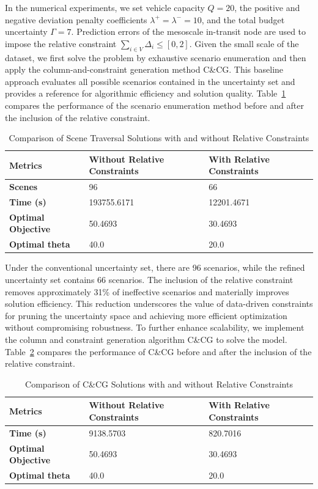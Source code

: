 \documentclass[preprint,12pt,authoryear]{elsarticle}
\begin{document}
In the numerical experiments, we set vehicle capacity $Q = 20$, the positive and negative deviation penalty coefficients $\lambda^+ = \lambda^- = 10$, and the total budget uncertainty $\Gamma = 7$. Prediction errors of the mesoscale in-transit node are used to impose the relative constraint $\sum_{i\in V}\Delta_i \leq [0,2]$. Given the small scale of the dataset, we first solve the problem by exhaustive scenario enumeration and then apply the column-and-constraint generation method C\&CG. This baseline approach evaluates all possible scenarios contained in the uncertainty set and provides a reference for algorithmic efficiency and solution quality. Table~\ref{tab5} compares the performance of the scenario enumeration method before and after the inclusion of the relative constraint.

\begin{table}[htbp]
  \centering
  \caption{Comparison of Scene Traversal Solutions with and without Relative Constraints}\label{tab5}
    \begin{tabular}{l|l|l}
    \hline
    \textbf{Metrics} & \textbf{Without Relative Constraints} & \textbf{With Relative Constraints} \\
    \hline
    \textbf{Scenes} & 96 & 66 \\
    \hline
    \textbf{Time (s)} & 193755.6171 & 12201.4671 \\
    \hline
    \textbf{Optimal Objective} & 50.4693 & 30.4693 \\
    \hline
    \textbf{Optimal theta} & 40.0 & 20.0 \\
    \hline
    \end{tabular}%
\end{table}

Under the conventional uncertainty set, there are 96 scenarios, while the refined uncertainty set contains 66 scenarios. The inclusion of the relative constraint removes approximately 31\% of ineffective scenarios and materially improves solution efficiency. This reduction underscores the value of data-driven constraints for pruning the uncertainty space and achieving more efficient optimization without compromising robustness. To further enhance scalability, we implement the column and constraint generation algorithm C\&CG to solve the model. Table~\ref{tab6} compares the performance of C\&CG before and after the inclusion of the relative constraint.

\begin{table}[H]
  \centering
  \caption{Comparison of C\&CG Solutions with and without Relative Constraints}\label{tab6}
    \begin{tabular}{l|l|l}
    \hline
    \textbf{Metrics} & \textbf{Without Relative Constraints} & \textbf{With Relative Constraints} \\
    \hline
    \textbf{Time (s)} & 9138.5703 & 820.7016 \\
    \hline
    \textbf{Optimal Objective} & 50.4693 & 30.4693 \\
    \hline
    \textbf{Optimal theta} & 40.0 & 20.0 \\
    \hline
    \end{tabular}%
\end{table}
\end{document}
